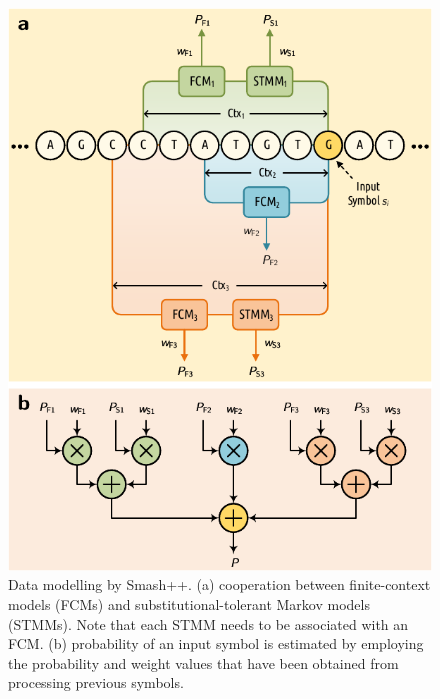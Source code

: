 \documentclass[a4paper,num-refs]{oup-contemporary}
\begin{document}
\begin{figure}[!t]
  \centering
  \includegraphics[width=\linewidth]{data_model.pdf}
  \caption{Data modelling by Smash++. (a) cooperation between finite-context models (FCMs) and substitutional-tolerant Markov models (STMMs). Note that each STMM needs to be associated with an FCM. (b) probability of an input symbol is estimated by employing the probability and weight values that have been obtained from processing previous symbols.}
  \label{fig.model}
\end{figure}
\end{document}
